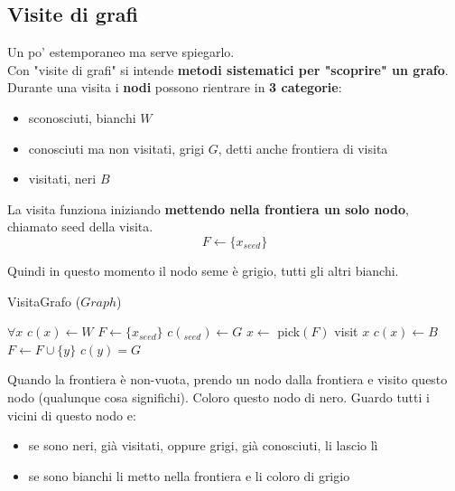 \newpage

\subsection*{Visite di grafi}
Un po' estemporaneo ma serve spiegarlo.\\

Con "visite di grafi" si intende \textbf{metodi sistematici per "scoprire" un grafo}. Durante una visita i \textbf{nodi} possono rientrare in \textbf{3 categorie}:
\begin{itemize}
	\item sconosciuti, bianchi $W$ 
	\item conosciuti ma non visitati, grigi $G$, detti anche frontiera di visita
	\item visitati, neri $B$
\end{itemize}

La visita funziona iniziando \textbf{mettendo nella frontiera un solo nodo}, chiamato seed della visita. 
$$ F \leftarrow \{x_{seed}\}$$

Quindi in questo momento il nodo seme è grigio, tutti gli altri bianchi.
\begin{algorithm}
	\caption{VisitaGrafo ($Graph$)}
	\begin{algorithmic}
		\STATE $\forall x$ $c(x) \leftarrow W$
		\STATE $F \leftarrow \{x_{seed}\}$
		\STATE $c (_{seed}) \leftarrow G$
		\STATE $x \leftarrow $ pick$(F)$
		\STATE visit $x$
		\STATE $c(x) \leftarrow B$
		\STATE $F \leftarrow F \cup \{y\}$
		\STATE $c(y) = G$
		\ENDIF
		\ENDFOR
		\ENDWHILE
	\end{algorithmic}
\end{algorithm}

\newpage

Quando la frontiera è non-vuota, prendo un nodo dalla frontiera e visito questo nodo (qualunque cosa significhi). Coloro questo nodo di nero. Guardo tutti i vicini di questo nodo e:
\begin{itemize}
	\item se sono neri, già visitati, oppure grigi, già conosciuti, li lascio lì
	\item se sono bianchi li metto nella frontiera e li coloro di grigio
\end{itemize}

